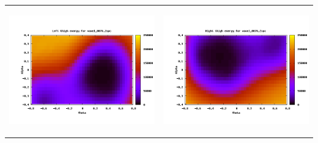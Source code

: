 \documentclass[12pt,a4paper]{article}
\begin{document}
\begin{tabular}{p{9cm} p{9cm}}
	\begin{center}\includegraphics[width=9cm]{good-leftthigh.png}\end{center}&
	\begin{center}\includegraphics[width=9cm]{good-rightthigh.png}\end{center}\\
	

\end{tabular}
\end{document}
